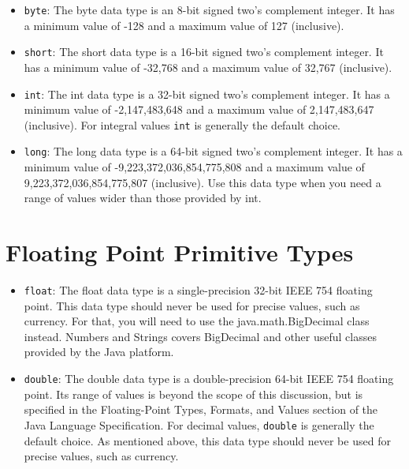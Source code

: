 \documentclass{article}
\begin{document}
\begin{itemize}
\item  {\tt byte}: The byte data type is an 8-bit signed two's complement integer. It has a minimum value of -128 and a maximum value of 127 (inclusive).

\item {\tt short}: The short data type is a 16-bit signed two's complement integer. It has a minimum value of -32,768 and a maximum value of 32,767 (inclusive).

\item {\tt int}: The int data type is a 32-bit signed two's complement integer. It has a minimum value of -2,147,483,648 and a maximum value of 2,147,483,647 (inclusive). For integral values {\tt int} is generally the default choice.

\item {\tt long}: The long data type is a 64-bit signed two's complement integer. It has a minimum value of -9,223,372,036,854,775,808 and a maximum value of 9,223,372,036,854,775,807 (inclusive). Use this data type when you need a range of values wider than those provided by int.
\end{itemize}




\section{Floating Point Primitive Types}


\begin{itemize}
\item {\tt float}: The float data type is a single-precision 32-bit IEEE 754 floating point. This data type should never be used for precise values, such as currency. For that, you will need to use the java.math.BigDecimal class instead. Numbers and Strings covers BigDecimal and other useful classes provided by the Java platform.

\item {\tt double}: The double data type is a double-precision 64-bit IEEE 754 floating point. Its range of values is beyond the scope of this discussion, but is specified in the Floating-Point Types, Formats, and Values section of the Java Language Specification. For decimal values, {\tt double} is generally the default choice. As mentioned above, this data type should never be used for precise values, such as currency.
\end{itemize}
\end{document}
